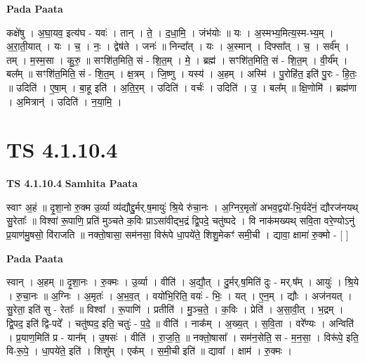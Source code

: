 \documentclass[17pt]{extarticle}
\begin{document}
\textbf{Pada Paata} \newline

कक्षे॑षु । अ॒घा॒यव॒ इत्य॑घ - यवः॑ । तान् । ते॒ । द॒धा॒मि॒ । जंभ॑योः ॥ यः । अ॒स्मभ्य॒मित्य॒स्म-भ्य॒म् । अ॒रा॒ती॒यात् । यः । च॒ । नः॒ । द्वेष॑ते । जनः॑ ॥ निन्दा᳚त् । यः । अ॒स्मान् । दिफ्सा᳚त् । च॒ । सर्व᳚म् । तम् । म॒स्म॒सा । कु॒रु॒ ॥ सꣳशि॑त॒मिति॒ सं - शि॒त॒म् । मे॒ । ब्रह्म॑ । सꣳशि॑त॒मिति॒ सं - शि॒त॒म् । वी॒र्य᳚म् । बल᳚म् ॥ सꣳशि॑त॒मिति॒ सं - शि॒त॒म् । क्ष॒त्रम् । जि॒ष्णु । यस्य॑ । अ॒हम् । अस्मि॑ । पु॒रोहि॑त॒ इति॑ पु॒रः - हि॒तः॒ ॥ उदिति॑ । ए॒षा॒म् । बा॒हू इति॑ । अ॒ति॒र॒म् । उदिति॑ । वर्चः॑ । उदिति॑ । उ॒ । बल᳚म् ॥ क्षि॒णोमि॑ । ब्रह्म॑णा । अ॒मित्रान्॑ । उदिति॑ । न॒या॒मि॒ ।  \newline





\section{ TS 4.1.10.4 }

\textbf{TS 4.1.10.4 } \newline
\textbf{Samhita Paata} \newline

स्वाꣳ अ॒हं ॥ दृ॒शा॒नो रु॒क्म उ॒र्व्या व्य॑द्यौद्दु॒र्मर्.ष॒मायुः॑ श्रि॒ये रु॑चा॒नः । अ॒ग्निर॒मृतो॑ अभव॒द्वयो॑-भि॒र्यदे॑नं॒ द्यौरज॑नयथ् सु॒रेताः᳚ ॥ विश्वा॑ रू॒पाणि॒ प्रति॑ मुञ्चते क॒विः प्राऽसा॑वीद्भ॒द्रं द्वि॒पदे॒ चतु॑ष्पदे । वि नाक॑मख्यथ् सवि॒ता वरे॒ण्योऽनु॑ प्र॒याण॑मु॒षसो॒ वि॑राजति ॥ नक्तो॒षासा॒ सम॑नसा॒ विरू॑पे धा॒पये॑ते॒ शिशु॒मेकꣳ॑ समी॒ची । द्यावा॒ क्षामा॑ रु॒क्मो - [  ] \newline

\textbf{Pada Paata} \newline

स्वान् । अ॒हम् ॥ दृ॒शा॒नः । रु॒क्मः । उ॒र्व्या । वीति॑ । अ॒द्यौ॒त् । दु॒र्मर्.ष॒मिति॑ दुः - मर्.ष᳚म् । आयुः॑ । श्रि॒ये । रु॒चा॒नः ॥ अ॒ग्निः । अ॒मृतः॑ । अ॒भ॒व॒त् । वयो॑भि॒रिति॒ वयः॑ - भिः॒ । यत् । ए॒न॒म् । द्यौः । अज॑नयत् । सु॒रेता॒ इति॑ सु - रेताः᳚ ॥ विश्वा᳚ । रू॒पाणि॑ । प्रतीति॑ । मु॒ञ्च॒ते॒ । क॒विः । प्रेति॑ । अ॒सा॒वी॒त् । भ॒द्रम् । द्वि॒पद॒ इति॑ द्वि-पदे᳚ । चतु॑ष्पद॒ इति॒ चतुः॑ - प॒दे॒ ॥ वीति॑ । नाक᳚म् । अ॒ख्य॒त् । स॒वि॒ता । वरे᳚ण्यः । अन्विति॑ । प्र॒याण॒मिति॑ प्र - यान᳚म् । उ॒षसः॑ । वीति॑ । रा॒ज॒ति॒ ॥ नक्तो॒षासा᳚ । सम॑न॒सेति॒ स - म॒न॒सा॒ । विरू॑पे॒ इति॒ वि-रू॒पे॒ । धा॒पये॑ते॒ इति॑ । शिशु᳚म् । एक᳚म् । स॒मी॒ची इति॑ ॥ द्यावा᳚ । क्षाम॑ । रु॒क्मः ।  \newline
\end{document}
